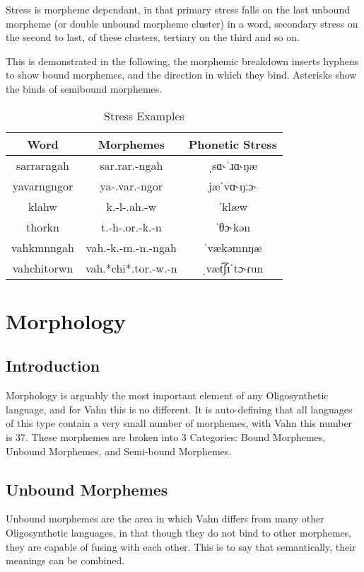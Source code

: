 \documentclass{article}
\begin{document}
Stress is morpheme dependant, in that primary stress falls on the last unbound morpheme (or double unbound morpheme cluster) in a word, secondary stress on the second to last, of these clusters, tertiary on the third and so on.

This is demonstrated in the following, the morphemic breakdown inserts hyphens to show bound morphemes, and the direction in which they bind. Asterisks show the binds of semibound morphemes.

\begin{table}[H]
\centering
\begin{tabular}{c|c|c}
 Word & Morphemes & Phonetic Stress \\
 \hline
  sarrarngah & sar.rar.-ngah & ˌsɑ˞ˈɹɑ˞ŋæ  \\
  yavarngngor & ya-.var.-ngor & jæˈvɑ˞ŋːɔ˞ \\
  klahw & k.-l-.ah.-w & ˈklæw \\
  thorkn & t.-h-.or.-k.-n & ˈθɔ˞kən \\
  vahkmnngah & vah.-k.-m.-n.-ngah & ˈvækəmnŋæ \\
  vahchitorwn & vah.*chi*.tor.-w.-n & ˌvæt͡ʃɪˈtɔ˞ɾun
\end{tabular}
\caption{Stress Examples}
\label{Stress Examples}
\end{table}

\newpage

\section{Morphology}

\subsection{Introduction}

Morphology is arguably the most important element of any Oligosynthetic language, and for Vahn this is no different. It is auto-defining that all languages of this type contain a very small number of morphemes, with Vahn this number is 37. These morphemes are broken into 3 Categories: Bound Morphemes, Unbound Morphemes, and Semi-bound Morphemes.

\subsection{Unbound Morphemes}

Unbound morphemes are the area in which Vahn differs from many other Oligosynthetic languages, in that though they do not bind to other morphemes, they are capable of fusing with each other. This is to say that semantically, their meanings can be combined.
\end{document}
